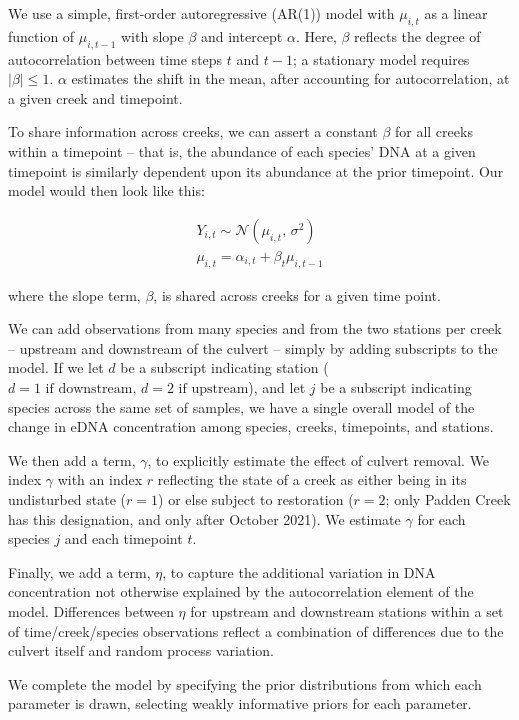\documentclass[
]{article}
\begin{document}
We use a simple, first-order autoregressive (AR(1)) model with
\(\mu_{i,t}\) as a linear function of \(\mu_{i,t-1}\) with slope
\(\beta\) and intercept \(\alpha\). Here, \(\beta\) reflects the degree
of autocorrelation between time steps \(t\) and \(t-1\); a stationary
model requires \(|\beta| \leq 1\). \(\alpha\) estimates the shift in the
mean, after accounting for autocorrelation, at a given creek and
timepoint.

To share information across creeks, we can assert a constant \(\beta\)
for all creeks within a timepoint -- that is, the abundance of each
species' DNA at a given timepoint is similarly dependent upon its
abundance at the prior timepoint. Our model would then look like this:

\begin{align*}
Y_{i,t} \sim \mathcal{N}(\mu_{i,t},\,\sigma^{2}) \\
\mu_{i,t} = \alpha_{i,t} + \beta_{t}\mu_{i,t-1} 
\end{align*}

where the slope term, \(\beta\), is shared across creeks for a given
time point.

We can add observations from many species and from the two stations per
creek -- upstream and downstream of the culvert -- simply by adding
subscripts to the model. If we let \(d\) be a subscript indicating
station (\(d = 1 \text{ if downstream, } d = 2 \text{ if upstream}\)),
and let \(j\) be a subscript indicating species across the same set of
samples, we have a single overall model of the change in eDNA
concentration among species, creeks, timepoints, and stations.

We then add a term, \(\gamma\), to explicitly estimate the effect of
culvert removal. We index \(\gamma\) with an index \(r\) reflecting the
state of a creek as either being in its undisturbed state (\(r = 1\)) or
else subject to restoration (\(r = 2\); only Padden Creek has this
designation, and only after October 2021). We estimate \(\gamma\) for
each species \(j\) and each timepoint \(t\).

Finally, we add a term, \(\eta\), to capture the additional variation in
DNA concentration not otherwise explained by the autocorrelation element
of the model. Differences between \(\eta\) for upstream and downstream
stations within a set of time/creek/species observations reflect a
combination of differences due to the culvert itself and random process
variation.

We complete the model by specifying the prior distributions from which
each parameter is drawn, selecting weakly informative priors for each
parameter.
\end{document}
